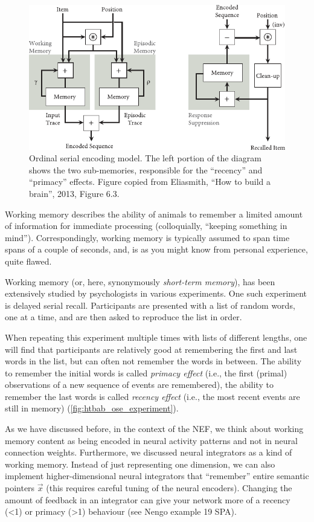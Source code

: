 \documentclass[10pt,letterpaper,oneside]{article}
\begin{document}
\begin{figure}[t]
	\centering
	\includegraphics[scale=1.2]{media/htbab_ose.pdf}
	\caption{Ordinal serial encoding model. The left portion of the diagram shows the two sub-memories, responsible for the \enquote{recency} and \enquote{primacy} effects. Figure copied from Eliasmith, \enquote{How to build a brain}, 2013, Figure 6.3.}
	\label{fig:htbab_ose}
\end{figure}

Working memory describes the ability of animals to remember a limited amount of information for immediate processing (colloquially, \enquote{keeping something in mind}). Correspondingly, working memory is typically assumed to span time spans of a couple of seconds, and, is as you might know from personal experience, quite flawed.

Working memory (or, here, synonymously \emph{short-term memory}), has been extensively studied by psychologists in various experiments. One such experiment is delayed serial recall. Participants are presented with a list of random words, one at a time, and are then asked to reproduce the list in order.

When repeating this experiment multiple times with lists of different lengths, one will find that participants are relatively good at remembering the first and last words in the list, but can often not remember the words in between. The ability to remember the initial words is called \emph{primacy effect} (i.e., the first (primal) observations of a new sequence of events are remembered), the ability to remember the last words is called \emph{recency effect} (i.e., the most recent events are still in memory) (\cref{fig:htbab_ose_experiment}).

As we have discussed before, in the context of the NEF, we think about working memory content as being encoded in neural activity patterns and not in neural connection weights. Furthermore, we discussed neural integrators as a kind of working memory. Instead of just representing one dimension, we can also implement higher-dimensional neural integrators that \enquote{remember} entire semantic pointers $\vec x$ (this requires careful tuning of the neural encoders). Changing the amount of feedback in an integrator can give your network more of a recency (<1) or primacy (>1) behaviour (see Nengo example 19 SPA).
\end{document}
